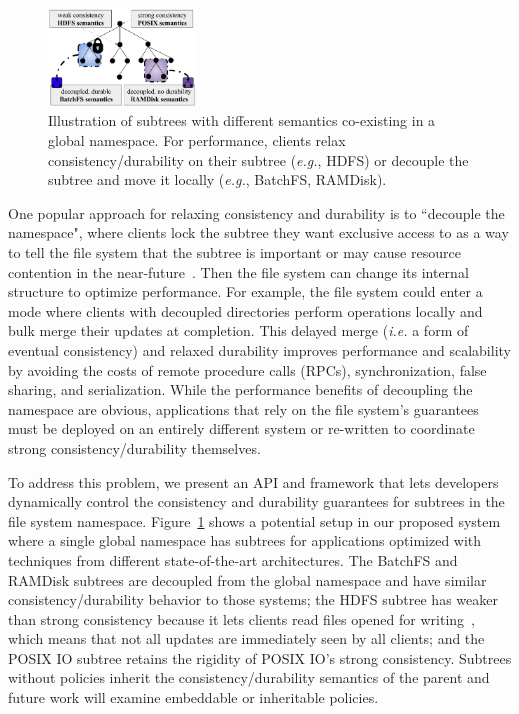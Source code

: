 \begin{figure}[tb] \centering
\includegraphics[width=0.35\textwidth]{figures/subtree-policies1.png}
\caption{Illustration of subtrees with different semantics co-existing in a
global namespace.  For performance, clients  relax consistency/durability on their
subtree ({\it e.g.}, HDFS) or decouple the subtree and move it locally ({\it e.g.}, BatchFS, RAMDisk).
}\label{fig:subtree-policies} \end{figure}

One popular approach for relaxing consistency and durability is to ``decouple
the namespace", where clients lock the subtree they want exclusive access to as
a way to tell the file system that the subtree is important or may cause
resource contention in the near-future~\cite{grider:pdsw2015-marfs,
zheng:pdsw2015-deltafs, zheng:pdsw2014-batchfs, ren:sc2014-indexfs,
bent:slides-twotiers}. Then the file system can change its internal structure
to optimize performance. For example, the file system could enter a mode where
clients with decoupled directories perform operations locally and bulk merge their
updates at completion. This delayed merge ({\it i.e.} a form of eventual
consistency) and relaxed durability improves performance and scalability by
avoiding the costs of remote procedure calls (RPCs), synchronization, false
sharing, and serialization.  While the performance benefits of decoupling the
namespace are obvious, applications that rely on the file system's guarantees
must be deployed on an entirely different system or re-written to coordinate
strong consistency/durability themselves. 

To address this problem, we present an API and framework that lets developers
dynamically control the consistency and durability guarantees for subtrees in
the file system namespace.  Figure~\ref{fig:subtree-policies} shows a potential
setup in our proposed system where a single global namespace has subtrees for
applications optimized with techniques from different state-of-the-art
architectures.  The BatchFS and RAMDisk subtrees are decoupled from the global
namespace and have similar consistency/durability behavior to those systems;
the HDFS subtree has weaker than strong consistency because it lets clients
read files opened for writing~\cite{hakimzadeh:dais14-hdfs-consistency}, which
means that not all updates are immediately seen by all clients; and the POSIX
IO subtree retains the rigidity of POSIX IO's strong consistency.  Subtrees
without policies inherit the consistency/durability semantics of the parent and
future work will examine embeddable or inheritable policies.

